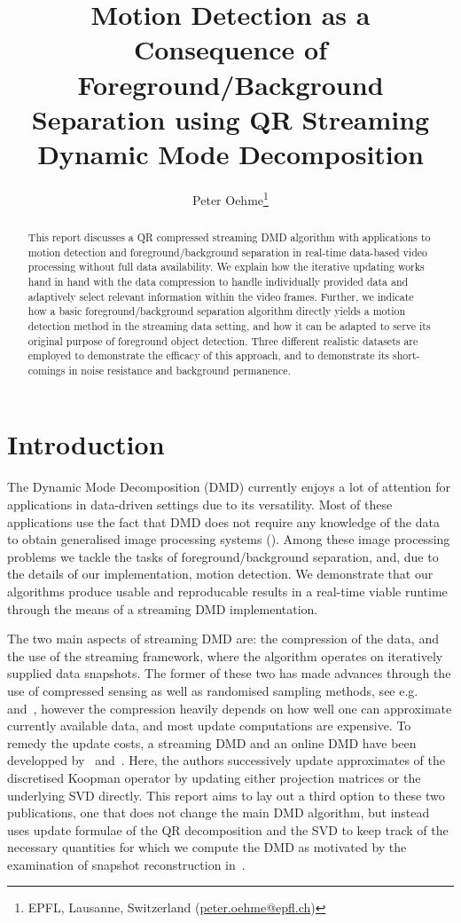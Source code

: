 \documentclass{article}
\title{Motion Detection as a Consequence of Foreground/Background Separation using QR Streaming Dynamic Mode Decomposition}
\author{Peter Oehme\thanks{EPFL, Lausanne, Switzerland (\href{mailto:peter.oehme@epfl.ch}{peter.oehme@epfl.ch})}}
\begin{document}
    \maketitle

    \begin{abstract}
        This report discusses a QR compressed streaming DMD algorithm with applications to motion detection and foreground/background separation in real-time data-based video processing without full data availability. We explain how the iterative updating works hand in hand with the data compression to handle individually provided data and adaptively select relevant information within the video frames. Further, we indicate how a basic foreground/background separation algorithm directly yields a motion detection method in the streaming data setting, and how it can be adapted to serve its original purpose of foreground object detection. Three different realistic datasets are employed to demonstrate the efficacy of this approach, and to demonstrate its short-comings in noise resistance and background permanence.
    \end{abstract}

    \section{Introduction}

    The Dynamic Mode Decomposition (DMD) currently enjoys a lot of attention for applications in data-driven settings due to its versatility. Most of these applications use the fact that DMD does not require any knowledge of the data to obtain generalised image processing systems (\cite{Grosek2014, Kutz2015, Bi2018, Erichson2019a, UlHaq2020}). Among these image processing problems we tackle the tasks of foreground/background separation, and, due to the details of our implementation, motion detection. We demonstrate that our algorithms produce usable and reproducable results in a real-time viable runtime through the means of a streaming DMD implementation.

    The two main aspects of streaming DMD are: the compression of the data, and the use of the streaming framework, where the algorithm operates on iteratively supplied data snapshots. The former of these two has made advances through the use of compressed sensing as well as randomised sampling methods, see e.g.~\cite{Brunton2016a} and~\cite{Erichson2019}, however the compression heavily depends on how well one can approximate currently available data, and most update computations are expensive. To remedy the update costs, a streaming DMD and an online DMD have been developped by~\cite{Hemati2014} and~\cite{Nedzhibov2023}. Here, the authors successively update approximates of the discretised Koopman operator by updating either projection matrices or the underlying SVD directly. This report aims to lay out a third option to these two publications, one that does not change the main DMD algorithm, but instead uses update formulae of the QR decomposition and the SVD to keep track of the necessary quantities for which we compute the DMD as motivated by the examination of snapshot reconstruction in~\cite{Drmac2020VandermondeKhatriRao}.
\end{document}
